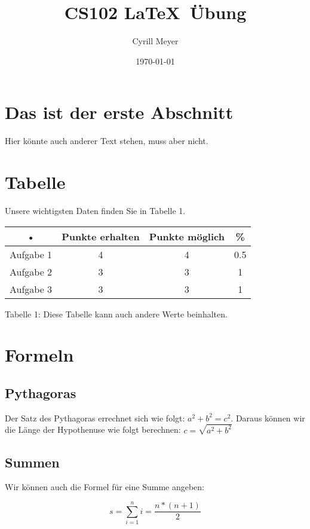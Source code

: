 \documentclass{article}
\title{CS102 \LaTeX\ \"Ubung}
\author{Cyrill Meyer}
\date{\today }
\begin{document}
\maketitle

\section{Das ist der erste Abschnitt}

Hier k\"onnte auch anderer Text stehen, muss aber nicht.

\section{Tabelle}

Unsere wichtigsten Daten finden Sie in Tabelle 1.

\begin{center}
\begin{tabular}{c|c|c|c}
• & Punkte erhalten & Punkte m\"oglich & \% \\ 
\hline 
Aufgabe 1 & 4 & 4 & 0.5 \\ 
Aufgabe 2 & 3 & 3 & 1 \\ 
Aufgabe 3 & 3 & 3 & 1 \\ 
\end{tabular}

\vspace{1em}
Tabelle 1: Diese Tabelle kann auch andere Werte beinhalten.
\end{center}

\section{Formeln}

\subsection{Pythagoras}

Der Satz des Pythagoras errechnet sich wie folgt: $a^2+b^2=c^2$. Daraus k\"onnen wir die L\"ange der Hypothenuse wie folgt berechnen: $c=\sqrt{a^2+b^2}$

\subsection{Summen}

Wir k\"onnen auch die Formel f\"ur eine Summe angeben:

\begin{equation}
s=\sum_{i=1}^n i=\frac{n*(n+1)}{2}
\end{equation}
\end{document}
